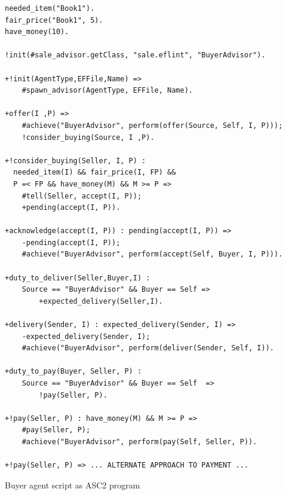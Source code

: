 %
\begin{listing}[!h]
\begin{verbatim}
needed_item("Book1").
fair_price("Book1", 5).
have_money(10).

!init(#sale_advisor.getClass, "sale.eflint", "BuyerAdvisor").

+!init(AgentType,EFFile,Name) => 
    #spawn_advisor(AgentType, EFFile, Name).

+offer(I ,P) =>
    #achieve("BuyerAdvisor", perform(offer(Source, Self, I, P)));
    !consider_buying(Source, I ,P).
    
+!consider_buying(Seller, I, P) : 
  needed_item(I) && fair_price(I, FP) &&
  P =< FP && have_money(M) && M >= P =>
    #tell(Seller, accept(I, P));
    +pending(accept(I, P)).

+acknowledge(accept(I, P)) : pending(accept(I, P)) =>
    -pending(accept(I, P));
    #achieve("BuyerAdvisor", perform(accept(Self, Buyer, I, P))).

+duty_to_deliver(Seller,Buyer,I) : 
    Source == "BuyerAdvisor" && Buyer == Self => 
        +expected_delivery(Seller,I).
    
+delivery(Sender, I) : expected_delivery(Sender, I) =>
    -expected_delivery(Sender, I);
    #achieve("BuyerAdvisor", perform(deliver(Sender, Self, I)).

+duty_to_pay(Buyer, Seller, P) :
    Source == "BuyerAdvisor" && Buyer == Self  =>
        !pay(Seller, P).
    
+!pay(Seller, P) : have_money(M) && M >= P => 
    #pay(Seller, P);
    #achieve("BuyerAdvisor", perform(pay(Self, Seller, P)).
    
+!pay(Seller, P) => ... ALTERNATE APPROACH TO PAYMENT ...
\end{verbatim}
\caption{Buyer agent script as ASC2 program}
\label{asc:buyer}
\end{listing}


